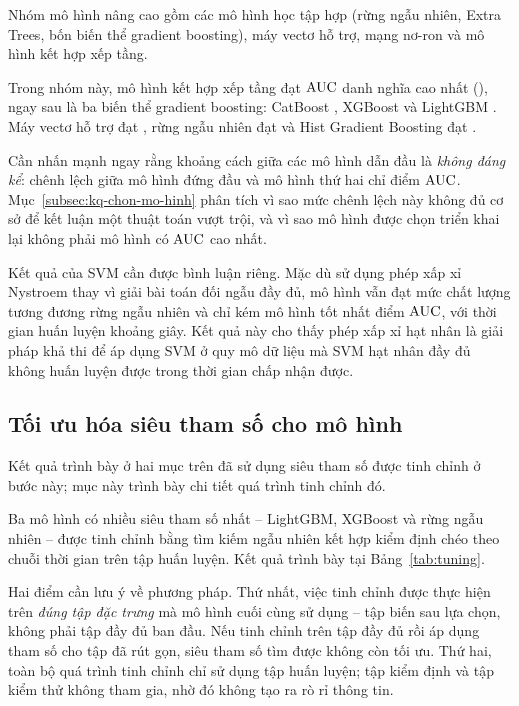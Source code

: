 Nhóm mô hình nâng cao gồm các mô hình học tập hợp (rừng ngẫu nhiên, Extra Trees,
bốn biến thể gradient boosting), máy vectơ hỗ trợ, mạng nơ-ron và mô hình kết hợp
xếp tầng.

Trong nhóm này, mô hình kết hợp xếp tầng đạt $\mathrm{AUC}$ danh nghĩa cao nhất
(\TopAUC{}), ngay sau là ba biến thể gradient boosting: CatBoost \CatAUC{},
XGBoost \XGBAUC{} và LightGBM \LGBAUC{}. Máy vectơ hỗ trợ đạt \SVMAUC{}, rừng
ngẫu nhiên đạt \RFAUC{} và Hist Gradient Boosting đạt \GBAUC{}.

Cần nhấn mạnh ngay rằng khoảng cách giữa các mô hình dẫn đầu là \textit{không
đáng kể}: chênh lệch giữa mô hình đứng đầu và mô hình thứ hai chỉ \GapTopSecond{}
điểm $\mathrm{AUC}$. Mục~\ref{subsec:kq-chon-mo-hinh} phân tích vì sao mức chênh lệch
này không đủ cơ sở để kết luận một thuật toán vượt trội, và vì sao mô hình được
chọn triển khai lại không phải mô hình có $\mathrm{AUC}$ cao nhất.

Kết quả của SVM cần được bình luận riêng. Mặc dù sử dụng phép xấp xỉ Nystroem
thay vì giải bài toán đối ngẫu đầy đủ, mô hình vẫn đạt mức chất lượng tương đương
rừng ngẫu nhiên và chỉ kém mô hình tốt nhất \GapBestSVM{} điểm $\mathrm{AUC}$, với thời
gian huấn luyện khoảng \SVMTrainSec{} giây. Kết quả này cho thấy phép xấp xỉ
hạt nhân là giải pháp khả thi để áp dụng SVM ở quy mô dữ liệu mà SVM hạt nhân đầy đủ không huấn
luyện được trong thời gian chấp nhận được.

\subsection{Tối ưu hóa siêu tham số cho mô hình}
\label{subsec:kq-tuning}

Kết quả trình bày ở hai mục trên đã sử dụng siêu tham số được tinh chỉnh ở bước
này; mục này trình bày chi tiết quá trình tinh chỉnh đó.

Ba mô hình có nhiều siêu tham số nhất -- LightGBM, XGBoost và rừng ngẫu nhiên --
được tinh chỉnh bằng tìm kiếm ngẫu nhiên kết hợp kiểm định chéo theo chuỗi thời
gian trên tập huấn luyện. Kết quả trình bày tại Bảng~\ref{tab:tuning}.



Hai điểm cần lưu ý về phương pháp. Thứ nhất, việc tinh chỉnh được thực hiện trên
\textit{đúng tập đặc trưng} mà mô hình cuối cùng sử dụng -- tập \NFeaturesSelected{}
biến sau lựa chọn, không phải tập đầy đủ ban đầu. Nếu tinh chỉnh trên tập đầy đủ
rồi áp dụng tham số cho tập đã rút gọn, siêu tham số tìm được không còn tối ưu.
Thứ hai, toàn bộ quá trình tinh chỉnh chỉ sử dụng tập huấn luyện; tập kiểm định
và tập kiểm thử không tham gia, nhờ đó không tạo ra rò rỉ thông tin.

